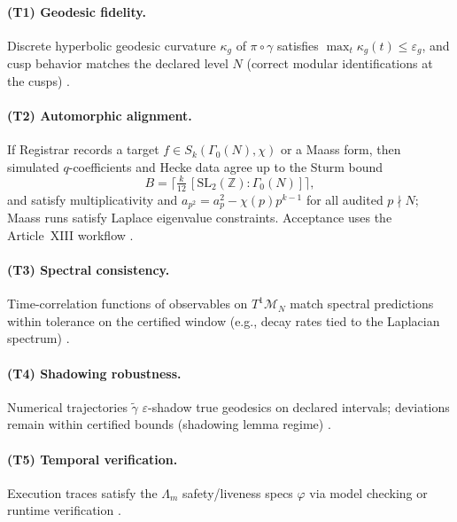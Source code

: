 \documentclass[12pt]{amsart}
\theoremstyle{plain}
\begin{document}
\paragraph{(T1) Geodesic fidelity.}
Discrete hyperbolic geodesic curvature $\kappa_g$ of $\pi\circ\gamma$ satisfies $\max_t \kappa_g(t)\le \varepsilon_g$, and cusp behavior matches the declared level $N$ (correct modular identifications at the cusps) \cite{katok1992fuchsian}.

\paragraph{(T2) Automorphic alignment.}
If Registrar records a target $f\in S_k(\Gamma_0(N),\chi)$ or a Maass form, then simulated $q$-coefficients and Hecke data agree up to the Sturm bound
\[
B=\Big\lceil \tfrac{k}{12}\,[\mathrm{SL}_2(\mathbb{Z}):\Gamma_0(N)] \Big\rceil,
\]
and satisfy multiplicativity and $a_{p^2}=a_p^2-\chi(p)p^{k-1}$ for all audited $p\nmid N$; Maass runs satisfy Laplace eigenvalue constraints. Acceptance uses the Article~XIII workflow \cite{sturm1987congruence,diamond2005first,iwaniec2002spectral}.

\paragraph{(T3) Spectral consistency.}
Time-correlation functions of observables on $T^1\mathcal{M}_N$ match spectral predictions within tolerance on the certified window (e.g., decay rates tied to the Laplacian spectrum) \cite{iwaniec2002spectral}.

\paragraph{(T4) Shadowing robustness.}
Numerical trajectories $\tilde{\gamma}$ $\varepsilon$-shadow true geodesics on declared intervals; deviations remain within certified bounds (shadowing lemma regime) \cite{pilyugin1999shadowing}.

\paragraph{(T5) Temporal verification.}
Execution traces satisfy the $\Lambda_m$ safety/liveness specs $\varphi$ via model checking or runtime verification \cite{clarke1999model,baier2008model}.
\end{document}
